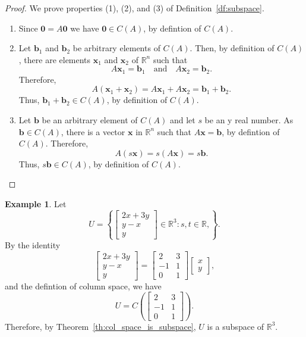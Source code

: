 \documentclass[12pt]{amsart}
\newcommand{\RR}{\mathbb{R}}
\theoremstyle{definition} \newtheorem{definition}[theorem]{Definition}
\newtheorem{example}[theorem]{Example}
\newcommand{\bb}{\mathbf{b}}
\newcommand{\bx}{\mathbf{x}}
\newcommand{\bzero}{\mathbf{0}}
\newcommand{\mat}[1]{\begin{bmatrix}#1\end{bmatrix}}
\begin{document}
\begin{proof} We prove properties (1), (2), and (3) of Definition~\ref{df:subspace}.
  \begin{enumerate}
    \item Since $\bzero = A\bzero$ we have $\bzero\in C(A)$, by defintion of $C(A)$.
    \item Let $\bb_1$ and $\bb_2$ be arbitrary elements of $C(A)$. Then, by definition of $C(A)$, there are elements $\bx_1$ and $\bx_2$ of $\RR^n$ such that
      \[
        A\bx_1=\bb_1\quad\text{and}\quad A\bx_2=\bb_2.
      \]
      Therefore,
      \[
        A(\bx_1+\bx_2) = A\bx_1 + A\bx_2 = \bb_1 + \bb_2.
      \]
      Thus, $\bb_1+\bb_2\in C(A)$, by definition of $C(A)$.
    \item Let $\bb$ be an arbitrary element of $C(A)$ and let $s$ be an y real number.
      As $\bb\in C(A)$, there is a vector $\bx$ in $\RR^n$ such that $A\bx=\bb$, by defintion of $C(A)$.
      Therefore,
      \[
        A(s\bx) = s(A\bx) = s\bb.
      \]
      Thus, $s\bb\in C(A)$, by definition of $C(A)$.\qedhere
  \end{enumerate}
\end{proof}

\begin{example}
  Let
  \[
    U =\left\{\mat{2x+3y\\y-x\\y}\in\RR^3 : s, t\in\RR,\right\}.
  \]
  By the identity
  \[
    \mat{2x+3y\\y-x\\y} = \mat{2&3\\-1&1\\0&1}\mat{x\\y},
  \]
  and the defintion of column space, we have
  \[
    U = C\left(\mat{2&3\\-1&1\\0&1}\right).
  \]
  Therefore, by Theorem~\ref{th:col_space_is_subspace}, $U$ is a subspace of $\RR^3$.
\end{example}
\end{document}
